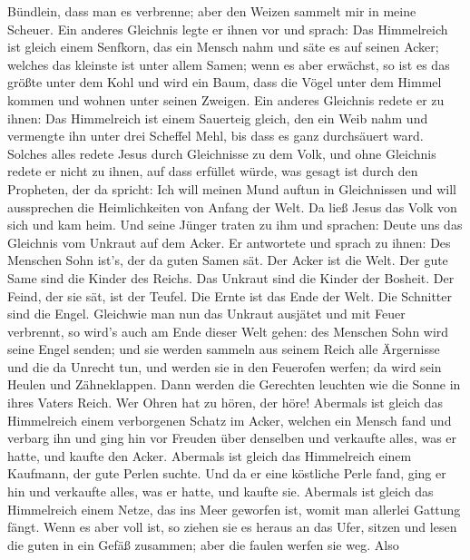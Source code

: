 Bündlein, dass man es verbrenne; aber den Weizen sammelt mir in meine
Scheuer.  Ein anderes Gleichnis legte er ihnen vor und
sprach: Das Himmelreich ist gleich einem Senfkorn, das ein Mensch nahm
und säte es auf seinen Acker;  welches das kleinste ist
unter allem Samen; wenn es aber erwächst, so ist es das größte unter dem
Kohl und wird ein Baum, dass die Vögel unter dem Himmel kommen und
wohnen unter seinen Zweigen.  Ein anderes Gleichnis redete
er zu ihnen: Das Himmelreich ist einem Sauerteig gleich, den ein Weib
nahm und vermengte ihn unter drei Scheffel Mehl, bis dass es ganz
durchsäuert ward.  Solches alles redete Jesus durch
Gleichnisse zu dem Volk, und ohne Gleichnis redete er nicht zu ihnen,
 auf dass erfüllet würde, was gesagt ist durch den
Propheten, der da spricht: Ich will meinen Mund auftun in Gleichnissen
und will aussprechen die Heimlichkeiten von Anfang der Welt.
 Da ließ Jesus das Volk von sich und kam heim. Und seine
Jünger traten zu ihm und sprachen: Deute uns das Gleichnis vom Unkraut
auf dem Acker.  Er antwortete und sprach zu ihnen: Des
Menschen Sohn ist's, der da guten Samen sät.  Der Acker ist
die Welt. Der gute Same sind die Kinder des Reichs. Das Unkraut sind die
Kinder der Bosheit.  Der Feind, der sie sät, ist der
Teufel. Die Ernte ist das Ende der Welt. Die Schnitter sind die Engel.
 Gleichwie man nun das Unkraut ausjätet und mit Feuer
verbrennt, so wird's auch am Ende dieser Welt gehen:  des
Menschen Sohn wird seine Engel senden; und sie werden sammeln aus seinem
Reich alle Ärgernisse und die da Unrecht tun,  und werden
sie in den Feuerofen werfen; da wird sein Heulen und Zähneklappen.
 Dann werden die Gerechten leuchten wie die Sonne in ihres
Vaters Reich. Wer Ohren hat zu hören, der höre!  Abermals
ist gleich das Himmelreich einem verborgenen Schatz im Acker, welchen
ein Mensch fand und verbarg ihn und ging hin vor Freuden über denselben
und verkaufte alles, was er hatte, und kaufte den Acker. 
Abermals ist gleich das Himmelreich einem Kaufmann, der gute Perlen
suchte.  Und da er eine köstliche Perle fand, ging er hin
und verkaufte alles, was er hatte, und kaufte sie. 
Abermals ist gleich das Himmelreich einem Netze, das ins Meer geworfen
ist, womit man allerlei Gattung fängt.  Wenn es aber voll
ist, so ziehen sie es heraus an das Ufer, sitzen und lesen die guten in
ein Gefäß zusammen; aber die faulen werfen sie weg.  Also
